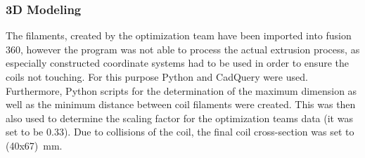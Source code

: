 \subsubsection{3D Modeling}
The filaments, created by the optimization team have been imported into fusion 360, however the program was not able to process the actual extrusion process, as especially constructed coordinate systems had to be used in order to ensure the coils not touching.
For this purpose Python and CadQuery were used. %
Furthermore, Python scripts for the determination of the maximum dimension as well as the minimum distance between coil filaments were created.
This was then also used to determine the scaling factor for the optimization teams data (it was set to be 0.33).
Due to collisions of the coil, the final coil cross-section was set to (40x67)~mm.\\


